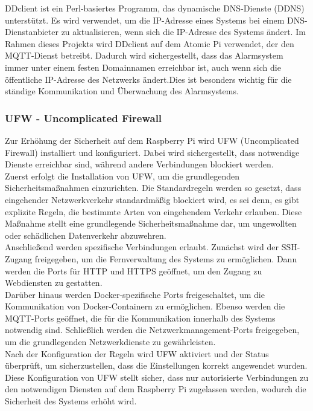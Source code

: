 DDclient ist ein Perl-basiertes Programm, das dynamische DNS-Dienste (DDNS) unterstützt. Es wird verwendet, um die IP-Adresse eines Systems bei einem DNS-Dienstanbieter zu aktualisieren, wenn sich die IP-Adresse des Systems ändert. Im Rahmen dieses Projekts wird DDclient auf dem Atomic Pi verwendet, der den MQTT-Dienst betreibt. Dadurch wird sichergestellt, dass das Alarmsystem immer unter einem festen Domainnamen erreichbar ist, auch wenn sich die öffentliche IP-Adresse des Netzwerks ändert.Dies ist besonders wichtig für die ständige Kommunikation und Überwachung des Alarmsystems.


\subsubsection{UFW - Uncomplicated Firewall}

Zur Erhöhung der Sicherheit auf dem Raspberry Pi wird UFW (Uncomplicated Firewall) installiert und konfiguriert. Dabei wird sichergestellt, dass notwendige Dienste erreichbar sind, während andere Verbindungen blockiert werden.\\

Zuerst erfolgt die Installation von UFW, um die grundlegenden Sicherheitsmaßnahmen einzurichten. Die Standardregeln werden so gesetzt, dass eingehender Netzwerkverkehr standardmäßig blockiert wird, es sei denn, es gibt explizite Regeln, die bestimmte Arten von eingehendem Verkehr erlauben. Diese Maßnahme stellt eine grundlegende Sicherheitsmaßnahme dar, um ungewollten oder schädlichen Datenverkehr abzuwehren.\\

Anschließend werden spezifische Verbindungen erlaubt. Zunächst wird der SSH-Zugang freigegeben, um die Fernverwaltung des Systems zu ermöglichen. Dann werden die Ports für HTTP und HTTPS geöffnet, um den Zugang zu Webdiensten zu gestatten.\\

Darüber hinaus werden Docker-spezifische Ports freigeschaltet, um die Kommunikation von Docker-Containern zu ermöglichen. Ebenso werden die MQTT-Ports geöffnet, die für die Kommunikation innerhalb des Systems notwendig sind. Schließlich werden die Netzwerkmanagement-Ports freigegeben, um die grundlegenden Netzwerkdienste zu gewährleisten.\\

Nach der Konfiguration der Regeln wird UFW aktiviert und der Status überprüft, um sicherzustellen, dass die Einstellungen korrekt angewendet wurden. Diese Konfiguration von UFW stellt sicher, dass nur autorisierte Verbindungen zu den notwendigen Diensten auf dem Raspberry Pi zugelassen werden, wodurch die Sicherheit des Systems erhöht wird.


